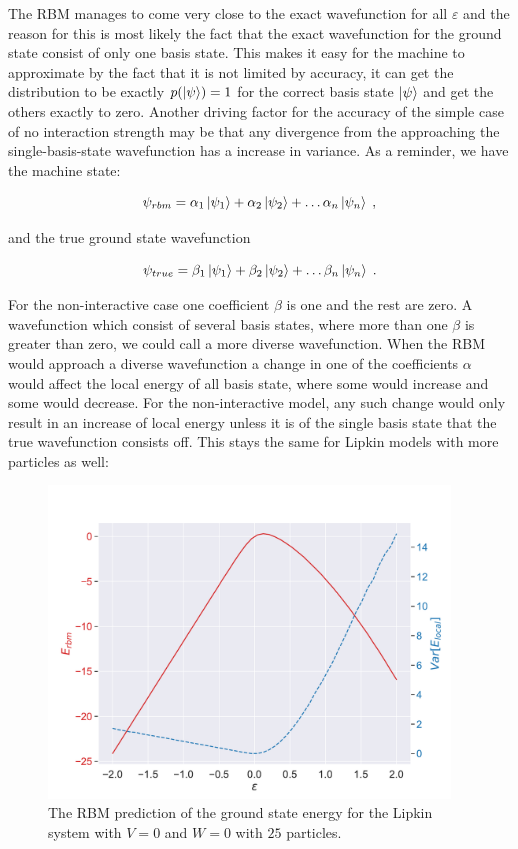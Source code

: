 The RBM manages to come very close to the exact wavefunction for all $\varepsilon$ and the reason for this is most likely the fact that the exact wavefunction for the ground state consist of only one basis state. This makes it easy for the machine to approximate by the fact that it is not limited by accuracy, it can get the distribution to be exactly $p(\ket{\psi}) = 1$ for the correct basis state $\ket{\psi}$ and get the others exactly to zero. Another driving factor for the accuracy of the simple case of no interaction strength may be that any divergence from the approaching the single-basis-state wavefunction has a increase in variance. As a reminder, we have the machine state:

$$\psi_{rbm} = \alpha_1\ket{\psi_1} + \alpha_2\ket{\psi_2} + \dots \alpha_n\ket{\psi_n} \; ,$$

and the true ground state wavefunction

$$\psi_{true} = \beta_1\ket{\psi_1} + \beta_2\ket{\psi_2} + \dots \beta_n\ket{\psi_n} \; .$$

For the non-interactive case one coefficient $\beta$ is one and the rest are zero. A wavefunction which consist of several basis states, where more than one $\beta$ is greater than zero, we could call a more diverse wavefunction. When the RBM would approach a diverse wavefunction a change in one of the coefficients $\alpha$ would affect the local energy of all basis state, where some would increase and some would decrease. For the non-interactive model, any such change would only result in an increase of local energy unless it is of the single basis state that the true wavefunction consists off. This stays the same for Lipkin models with more particles as well:

\begin{figure}[H]
  \begin{center}
    \includegraphics[width=0.95\textwidth]{Figures/Plots/Lipkin/[eps][-2.0-2.0][e=250][n=25][V=0][W=0].pdf}
  \end{center}
  \caption{The RBM prediction of the ground state energy for the Lipkin system with $V=0$ and $W=0$ with $25$ particles.}
\end{figure}

